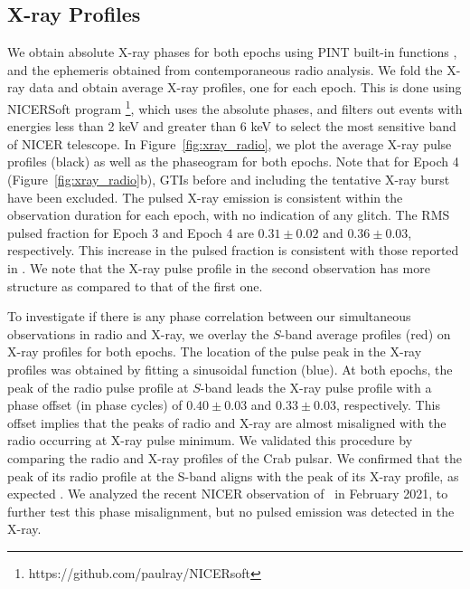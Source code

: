 \documentclass[twocolumn]{emulateapj}
\begin{document}
 


\subsection{X-ray Profiles}
\label{ssec:xray_prof}
We obtain absolute X-ray phases for both epochs using PINT built-in functions 
\citep{Luo2019}, and the ephemeris obtained from contemporaneous radio analysis. 
We fold the X-ray data and obtain average X-ray profiles, one for each epoch. 
This is done using NICERSoft program \footnote{https://github.com/paulray/NICERsoft}, 
which uses the absolute phases, and filters out events with energies less than 2 keV 
and greater than 6 keV to select the most sensitive band of NICER telescope. 
In Figure~\ref{fig:xray_radio}, we plot the average X-ray pulse profiles (black) 
as well as the phaseogram for both epochs. Note that for Epoch 4 
(Figure~\ref{fig:xray_radio}b), GTIs before and including the tentative 
X-ray burst have been excluded. The pulsed X-ray emission is consistent within the 
observation duration for each epoch, with no indication of any glitch. The RMS pulsed 
fraction \citep{an2015} for Epoch 3 and Epoch 4 are $0.31 \pm 0.02$ and $0.36 \pm 0.03$, 
respectively. This increase in the pulsed fraction is consistent with those reported 
in \cite{hu2020}. We note that the X-ray pulse profile in the second observation 
has more structure as compared to that of the first one.

To investigate if there is any phase correlation between our simultaneous observations 
in radio and X-ray, we overlay the $S$-band average profiles (red) on X-ray profiles 
for both epochs. The location of the pulse peak in the X-ray profiles was obtained 
by fitting a sinusoidal function (blue). At both epochs, the peak of the radio pulse 
profile at $S$-band leads the X-ray pulse profile with a phase offset (in phase cycles) 
of $0.40 \pm 0.03 $ and $0.33 \pm 0.03$, respectively. This offset implies that the 
peaks of radio and X-ray are almost misaligned with the radio occurring at X-ray pulse 
minimum. We validated this procedure by comparing the radio and X-ray profiles of the 
Crab pulsar. We confirmed that the peak of its radio profile at the S-band aligns with 
the peak of its X-ray profile, as expected \citep{hankins2007}. We analyzed the recent 
NICER observation of \jmag\ in February 2021, to further test this phase misalignment, 
but no pulsed emission was detected in the X-ray.
\end{document}
